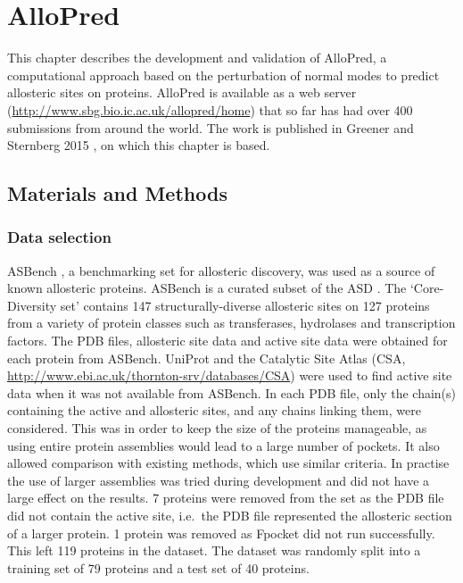 \chapter{AlloPred}
\label{cha:allopred}

This chapter describes the development and validation of AlloPred, a computational approach based on the perturbation of normal modes to predict allosteric sites on proteins.
AlloPred is available as a web server (\url{http://www.sbg.bio.ic.ac.uk/allopred/home}) that so far has had over 400 submissions from around the world.
The work is published in Greener and Sternberg 2015 \cite{Greener2015}, on which this chapter is based.


\section{Materials and Methods}
\label{sec:allopred_methods}

\subsection{Data selection}

ASBench \cite{Huang2015}, a benchmarking set for allosteric discovery, was used as a source of known allosteric proteins.
ASBench is a curated subset of the ASD \cite{Shen2016}.
The `Core-Diversity set' contains 147 structurally-diverse allosteric sites on 127 proteins from a variety of protein classes such as transferases, hydrolases and transcription factors.
The PDB files, allosteric site data and active site data were obtained for each protein from ASBench.
UniProt \cite{TheUniProtConsortium2015} and the Catalytic Site Atlas (CSA, \url{http://www.ebi.ac.uk/thornton-srv/databases/CSA}) \cite{Furnham2014} were used to find active site data when it was not available from ASBench.
In each PDB file, only the chain(s) containing the active and allosteric sites, and any chains linking them, were considered.
This was in order to keep the size of the proteins manageable, as using entire protein assemblies would lead to a large number of pockets.
It also allowed comparison with existing methods, which use similar criteria.
In practise the use of larger assemblies was tried during development and did not have a large effect on the results.
7 proteins were removed from the set as the PDB file did not contain the active site, i.e.\ the PDB file represented the allosteric section of a larger protein.
1 protein was removed as Fpocket did not run successfully.
This left 119 proteins in the dataset.
The dataset was randomly split into a training set of 79 proteins and a test set of 40 proteins.


